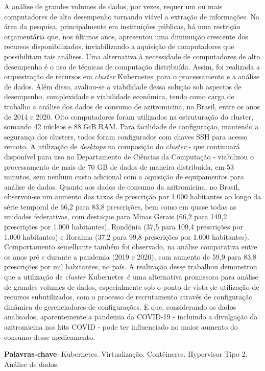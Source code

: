
\begin{resumo}

    A análise de grandes volumes de dados, por vezes, requer um ou mais computadores de alto desempenho tornando viável a extração de informações. Na área da pesquisa, principalmente em instituições públicas, há uma restrição orçamentária que, nos últimos anos, apresentou uma diminuição crescente dos recursos disponibilizados, inviabilizando a aquisição de computadores que possibilitam tais análises. Uma alternativa à necessidade de computadores de alto desempenho é o uso de técnicas de computação distribuída. Assim, foi realizada a orquestração de recursos em \emph{cluster} Kubernetes\textregistered\ para o processamento e a análise de dados. Além disso, avaliou-se a viabilidade dessa solução sob aspectos de desempenho, complexidade e viabilidade econômica, tendo como carga de trabalho a análise dos dados de consumo de azitromicina, no Brasil, entre os anos de 2014 e 2020.  Oito computadores foram utilizados na estruturação do cluster, somando 42 núcleos e 88 GiB RAM. Para facilidade de configuração, mantendo a segurança dos clusters, todos foram configurados com chaves SSH para acesso remoto. A utilização de \emph{desktops} na composição do \emph{cluster} - que continuará disponível para uso no Departamento de Ciências da Computação - viabilizou o processamento de mais de 70 GB de dados de maneira distribuída, em 53 minutos, sem nenhum custo adicional com a aquisição de equipamentos para análise de dados. Quanto aos dados de consumo da azitromicina, no Brasil, observou-se um aumento das taxas de prescrição por 1.000 habitantes ao longo da série temporal de 66,2 para 83,8 prescrições, bem como em quase todas as unidades federativas, com destaque para Minas Gerais (66,2 para 149,2 prescrições por 1.000 habitantes), Rondônia (37,5 para 109,4 prescrições por 1.000 habitantes) e Roraima (37,2 para 99,8 prescrições por 1.000 habitantes). Comportamento semelhante também foi observado, na análise comparativa entre os anos pré e durante a pandemia (2019 e 2020), com aumento de 59,9 para 83,8 prescrições por mil habitantes, no país. A realização desse trabalhou demonstrou que a utilização de \emph{cluster} Kubernetes\textregistered\ é uma alternativa promissora para análise de grandes volumes de dados, especialmente sob o ponto de vista de utilização de recursos subutilizados, com o processo de recrutamento através de configuração dinâmica de gerenciadores de configurações. E que, considerando os dados analisados, aparentemente a pandemia da COVID-19 - incluindo a divulgação da azitromicina nos kits COVID - pode ter influenciado no maior aumento do consumo desse medicamento.


    \textbf{Palavras-chave}: Kubernetes\textregistered. Virtualização. Contêineres. Hypervisor Tipo 2. Análise de dados.
\end{resumo}

